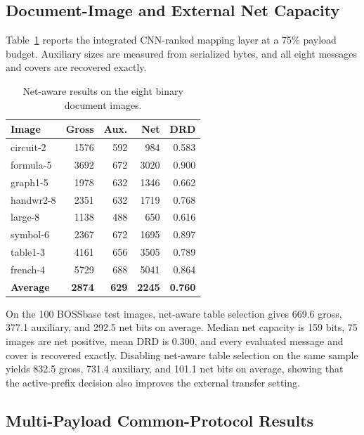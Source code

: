 \documentclass[a4paper,fleqn]{cas-dc}
\newcommand{\RevisionAddBegin}{\begingroup\color{revisionblue}}
\newcommand{\RevisionAddEnd}{\endgroup}
\begin{document}
\subsection{Document-Image and External Net Capacity}

Table~\ref{tab:document-net} reports the integrated CNN-ranked mapping layer at
a 75\% payload budget. Auxiliary sizes are measured from serialized bytes, and
all eight messages and covers are recovered exactly.

\begin{table}[t]
\centering
\caption{Net-aware results on the eight binary document images.}
\label{tab:document-net}
\begin{tabular}{@{}lrrrr@{}}
\toprule
\textbf{Image} & \textbf{Gross} & \textbf{Aux.} & \textbf{Net} & \textbf{DRD} \\
\midrule
circuit-2 & 1576 & 592 & 984 & 0.583 \\
formula-5 & 3692 & 672 & 3020 & 0.900 \\
graph1-5 & 1978 & 632 & 1346 & 0.662 \\
handwr2-8 & 2351 & 632 & 1719 & 0.768 \\
large-8 & 1138 & 488 & 650 & 0.616 \\
symbol-6 & 2367 & 672 & 1695 & 0.897 \\
table1-3 & 4161 & 656 & 3505 & 0.789 \\
french-4 & 5729 & 688 & 5041 & 0.864 \\
\midrule
\textbf{Average} & \textbf{2874} & \textbf{629} & \textbf{2245} & \textbf{0.760} \\
\bottomrule
\end{tabular}
\end{table}

\RevisionAddBegin
On the 100 BOSSbase test images, net-aware table selection gives 669.6 gross,
377.1 auxiliary, and 292.5 net bits on average. Median net capacity is 159
bits, 75 images are net positive, mean DRD is 0.300, and every evaluated
message and cover is recovered exactly. Disabling net-aware table selection on
the same sample yields 832.5 gross, 731.4 auxiliary, and 101.1 net bits on
average, showing that the active-prefix decision also improves the external
transfer setting.
\RevisionAddEnd

\subsection{Multi-Payload Common-Protocol Results}
\end{document}
